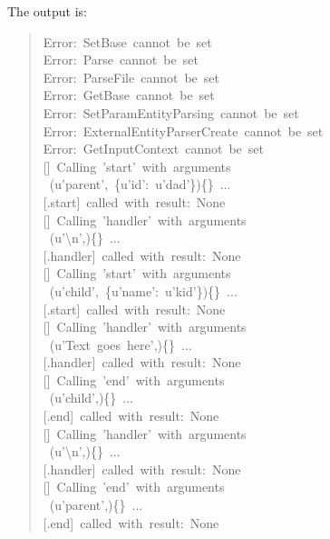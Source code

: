 \documentclass[10pt,english]{article}
\begin{document}
The output is:
\begin{quote}
\begin{ttfamily}\begin{flushleft}
\mbox{Error:~SetBase~cannot~be~set}\\
\mbox{Error:~Parse~cannot~be~set}\\
\mbox{Error:~ParseFile~cannot~be~set}\\
\mbox{Error:~GetBase~cannot~be~set}\\
\mbox{Error:~SetParamEntityParsing~cannot~be~set}\\
\mbox{Error:~ExternalEntityParserCreate~cannot~be~set}\\
\mbox{Error:~GetInputContext~cannot~be~set}\\
\mbox{[]~Calling~'start'~with~arguments}\\
\mbox{~(u'parent',~{\{}u'id':~u'dad'{\}}){\{}{\}}~...}\\
\mbox{[.start]~called~with~result:~None}\\
\mbox{[]~Calling~'handler'~with~arguments}\\
\mbox{~(u'{\textbackslash}n',){\{}{\}}~...}\\
\mbox{[.handler]~called~with~result:~None}\\
\mbox{[]~Calling~'start'~with~arguments}\\
\mbox{~(u'child',~{\{}u'name':~u'kid'{\}}){\{}{\}}~...}\\
\mbox{[.start]~called~with~result:~None}\\
\mbox{[]~Calling~'handler'~with~arguments}\\
\mbox{~(u'Text~goes~here',){\{}{\}}~...}\\
\mbox{[.handler]~called~with~result:~None}\\
\mbox{[]~Calling~'end'~with~arguments}\\
\mbox{~(u'child',){\{}{\}}~...}\\
\mbox{[.end]~called~with~result:~None}\\
\mbox{[]~Calling~'handler'~with~arguments}\\
\mbox{~(u'{\textbackslash}n',){\{}{\}}~...}\\
\mbox{[.handler]~called~with~result:~None}\\
\mbox{[]~Calling~'end'~with~arguments}\\
\mbox{~(u'parent',){\{}{\}}~...}\\
\mbox{[.end]~called~with~result:~None}
\end{flushleft}\end{ttfamily}
\end{quote}
\end{document}
